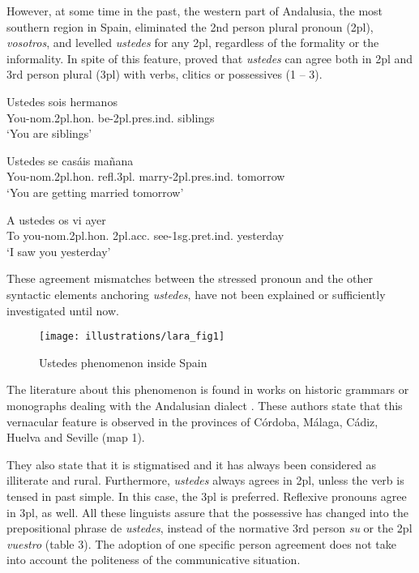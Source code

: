 \documentclass[output=paper]{LSP/langsci}
\begin{document}
However, at some time in the past, the western part of Andalusia, the most southern region in Spain, eliminated the 2nd person plural pronoun (2pl), \textit{vosotros}, and levelled \textit{ustedes} for any 2pl, regardless of the formality or the informality. In spite of this feature, \citet{lara_uso_2010} proved that \textit{ustedes} can agree both in 2pl and 3rd person plural (3pl) with verbs, clitics or possessives (1 – 3). 

\ea
\gll Ustedes                     sois          hermanos\\
 You-nom.2pl.hon. be-2pl.pres.ind. siblings\\
\glt`You are siblings'
\z

\ea
\gll Ustedes             se     casáis     mañana\\
 You-nom.2pl.hon. refl.3pl. marry-2pl.pres.ind. tomorrow\\
\glt ‘You are getting married tomorrow’\\
\z

\ea
\gll A   ustedes        os          vi       ayer\\
 To you-nom.2pl.hon. 2pl.acc. see-1sg.pret.ind.   yesterday\\
\glt ‘I saw you yesterday’\\
\z

These agreement mismatches between the stressed pronoun and the other syntactic elements anchoring \textit{ustedes}, have not been explained or sufficiently investigated until now.

\begin{figure}
\texttt{[image: illustrations/lara\_fig1]}
\caption{Ustedes phenomenon inside Spain}
\end{figure}

\rmfamily
The literature about this phenomenon is found in works on historic grammars or monographs dealing with the Andalusian dialect \citep{mondejar_verbo_1974,lapesa_estudios_2000,cano_historia_2004,penny_variacion_2004,menendez_pidal_historia_2005}. These authors state that this vernacular feature is observed in the provinces of Córdoba, Málaga, Cádiz, Huelva and Seville (map 1). 

\rmfamily
They also state that it is stigmatised and it has always been considered as illiterate and rural. Furthermore, \textit{ustedes} always agrees in 2pl, unless the verb is tensed in past simple. In this case, the 3pl is preferred. Reflexive pronouns agree in 3pl, as well. All these linguists assure that the possessive has changed into the prepositional phrase de \textit{ustedes}, instead of the normative 3rd person \textit{su} or the 2pl \textit{vuestro} (table 3). The adoption of one specific person agreement does not take into account the politeness of the communicative situation.
\end{document}
